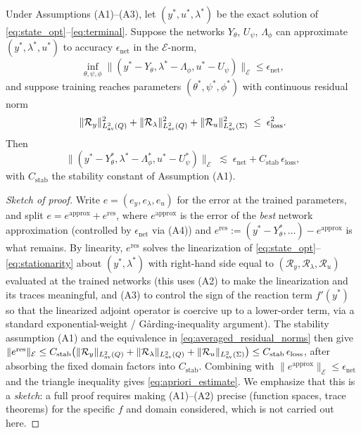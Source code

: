 \begin{theorem}
\label{thm:apriori}
Under Assumptions (A1)--(A3), let $(y^*, u^*, \lambda^*)$ be the exact solution of \eqref{eq:state_opt}--\eqref{eq:terminal}. Suppose the networks $Y_\theta$, $U_\psi$, $\Lambda_\phi$ can approximate $(y^*,\lambda^*,u^*)$ to accuracy $\epsilon_{\text{net}}$ in the $\mathcal{E}$-norm,
\begin{equation}
\label{eq:net_approx}
\inf_{\theta,\psi,\phi} \| (y^* - Y_\theta, \lambda^* - \Lambda_\phi, u^* - U_\psi) \|_{\mathcal{E}} \leq \epsilon_{\text{net}},
\end{equation}
and suppose training reaches parameters $(\theta^*,\psi^*,\phi^*)$ with continuous residual norm
\begin{equation}
\|\mathcal{R}_y\|_{L^2_{\rm av}(Q)}^2 + \|\mathcal{R}_\lambda\|_{L^2_{\rm av}(Q)}^2 + \|\mathcal{R}_u\|_{L^2_{\rm av}(\Sigma)}^2 \;\leq\; \epsilon_{\text{loss}}^2.
\end{equation}
Then
\begin{equation}
\label{eq:apriori_estimate}
\| (y^* - Y_\theta^*, \lambda^* - \Lambda_\phi^*, u^* - U_\psi^*) \|_{\mathcal{E}} \;\lesssim\; \epsilon_{\text{net}} + C_{\text{stab}}\,\epsilon_{\text{loss}},
\end{equation}
with $C_{\text{stab}}$ the stability constant of Assumption (A1).
\end{theorem}

\begin{proof}[Sketch of proof]
Write $e=(e_y,e_\lambda,e_u)$ for the error at the trained parameters, and split $e = e^{\mathrm{approx}} + e^{\mathrm{res}}$, where $e^{\mathrm{approx}}$ is the error of the \emph{best} network approximation (controlled by $\epsilon_{\text{net}}$ via (A4)) and $e^{\mathrm{res}} := (y^*-Y_\theta^*,\dots) - e^{\mathrm{approx}}$ is what remains. By linearity, $e^{\mathrm{res}}$ solves the linearization of \eqref{eq:state_opt}--\eqref{eq:stationarity} about $(y^*,\lambda^*)$ with right-hand side equal to $(\mathcal{R}_y,\mathcal{R}_\lambda,\mathcal{R}_u)$ evaluated at the trained networks (this uses (A2) to make the linearization and its traces meaningful, and (A3) to control the sign of the reaction term $f'(y^*)$ so that the linearized adjoint operator is coercive up to a lower-order term, via a standard exponential-weight / G\r{a}rding-inequality argument). The stability assumption (A1) and the equivalence in \eqref{eq:averaged_residual_norms} then give $\|e^{\mathrm{res}}\|_{\mathcal{E}} \leq C_{\text{stab}}\big(\|\mathcal{R}_y\|_{L^2_{\rm av}(Q)} + \|\mathcal{R}_\lambda\|_{L^2_{\rm av}(Q)} + \|\mathcal{R}_u\|_{L^2_{\rm av}(\Sigma)}\big) \leq C_{\text{stab}}\,\epsilon_{\text{loss}}$, after absorbing the fixed domain factors into $C_{\text{stab}}$. Combining with $\|e^{\mathrm{approx}}\|_{\mathcal{E}}\leq \epsilon_{\text{net}}$ and the triangle inequality gives \eqref{eq:apriori_estimate}. We emphasize that this is a \emph{sketch}: a full proof requires making (A1)--(A2) precise (function spaces, trace theorems) for the specific $f$ and domain considered, which is not carried out here.
\end{proof}

